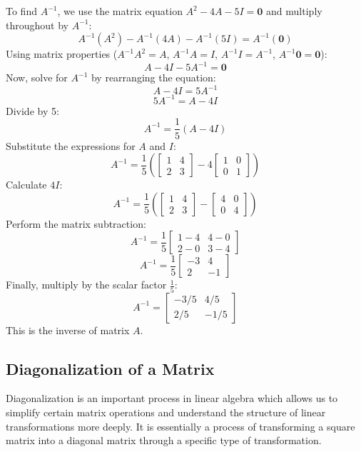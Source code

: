 \documentclass{article}
\begin{document}
To find $A^{-1}$, we use the matrix equation $A^2 - 4A - 5I = \mathbf{0}$ and multiply throughout by $A^{-1}$:
\[ A^{-1}(A^2) - A^{-1}(4A) - A^{-1}(5I) = A^{-1}(\mathbf{0}) \]
Using matrix properties ($A^{-1} A^2 = A$, $A^{-1}A = I$, $A^{-1}I = A^{-1}$, $A^{-1}\mathbf{0} = \mathbf{0}$):
\[ A - 4I - 5A^{-1} = \mathbf{0} \]
Now, solve for $A^{-1}$ by rearranging the equation:
\[ A - 4I = 5A^{-1} \]
\[ 5A^{-1} = A - 4I \]
Divide by 5:
\[ A^{-1} = \frac{1}{5} (A - 4I) \]
Substitute the expressions for $A$ and $I$:
\[ A^{-1} = \frac{1}{5} \left( \begin{bmatrix} 1 & 4 \\ 2 & 3 \end{bmatrix} - 4 \begin{bmatrix} 1 & 0 \\ 0 & 1 \end{bmatrix} \right) \]
Calculate $4I$:
\[ A^{-1} = \frac{1}{5} \left( \begin{bmatrix} 1 & 4 \\ 2 & 3 \end{bmatrix} - \begin{bmatrix} 4 & 0 \\ 0 & 4 \end{bmatrix} \right) \]
Perform the matrix subtraction:
\[ A^{-1} = \frac{1}{5} \begin{bmatrix} 1 - 4 & 4 - 0 \\ 2 - 0 & 3 - 4 \end{bmatrix} \]
\[ A^{-1} = \frac{1}{5} \begin{bmatrix} -3 & 4 \\ 2 & -1 \end{bmatrix} \]
Finally, multiply by the scalar factor $\frac{1}{5}$:
\[ A^{-1} = \begin{bmatrix} -3/5 & 4/5 \\ 2/5 & -1/5 \end{bmatrix} \]
This is the inverse of matrix $A$.


\subsection{Diagonalization of a Matrix} %

Diagonalization is an important process in linear algebra which allows us to simplify certain matrix operations and understand the structure of linear transformations more deeply. It is essentially a process of transforming a square matrix into a diagonal matrix through a specific type of transformation.
\end{document}
